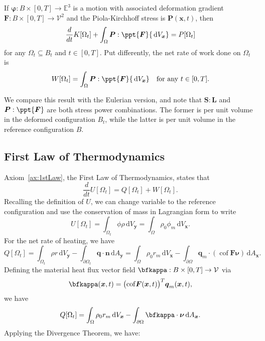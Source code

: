 \documentclass[
  letterpaper,
  DIV=11,
  numbers=noendperiod]{scrreprt}
\theoremstyle{plain}
\theoremstyle{remark}
\begin{document}
If \({\boldsymbol{\varphi}}:B\times[0,T]\to{\mathbb{E}}^3\) is a motion
with associated deformation gradient
\({\boldsymbol{F}}:B\times[0,T]\to{\mathcal{V}}^2\) and the
Piola-Kirchhoff stress is \({\boldsymbol{P}}({\boldsymbol{x}},t)\), then
\[\frac{d}{dt}K[\Omega_t] +\int_\Omega {\boldsymbol{P}}:\ppt{\boldsymbol{F}}{\,{\mathrm{d}}V_{{\boldsymbol{x}}}}= P[\Omega_t]\]
for any \(\Omega_t\subseteq B_t\) and \(t\in[0,T]\). Put differently,
the net rate of work done on \(\Omega_t\) is
\[W[\Omega_t] = \int_\Omega {\boldsymbol{P}}:\ppt{\boldsymbol{F}}{\,{\mathrm{d}}V_{{\boldsymbol{x}}}}\quad\text{for any }t\in[0,T].\]

We compare this result with the Eulerian version, and note that
\({\boldsymbol{S}}:{\boldsymbol{L}}\) and
\({\boldsymbol{P}}:\ppt{\boldsymbol{F}}\) are both stress power
combinations. The former is per unit volume in the deformed
configuration \(B_t\), while the latter is per unit volume in the
reference configuration \(B\).

\subsection{First Law of
Thermodynamics}\label{first-law-of-thermodynamics-1}

Axiom~\hyperref[ax:1stLaw]{{[}ax:1stLaw{]}}, the First Law of
Thermodynamics, states that
\[\frac{d}{dt}U[\Omega_t] = Q[\Omega_t]+W[\Omega_t].\] Recalling the
definition of \(U\), we can change variable to the reference
configuration and use the conservation of mass in Lagrangian form to
write
\[U[\Omega_t] = \int_{\Omega_t}\phi\rho {\,{\mathrm{d}}V_{{\boldsymbol{y}}}}= \int_{\Omega} \rho_0\phi_m{\,{\mathrm{d}}V_{{\boldsymbol{x}}}}.\]
For the net rate of heating, we have
\[Q[\Omega_t] = \int_{\Omega_t}\rho r {\,{\mathrm{d}}V_{{\boldsymbol{y}}}}-\int_{\partial\Omega_t}{\boldsymbol{q}}\cdot{\boldsymbol{n}}{\,{\mathrm{d}}A_{{\boldsymbol{y}}}}= \int_\Omega\rho_0r_m{\,{\mathrm{d}}V_{{\boldsymbol{x}}}}-\int_{\partial \Omega}{\boldsymbol{q}}_m\cdot({\operatorname{cof}}{\boldsymbol{F}}{\boldsymbol{\nu}}){\,{\mathrm{d}}A_{{\boldsymbol{x}}}}.\]
Defining the material heat flux vector field
\(\bfkappa:B\times[0,T]\to{\mathcal{V}}\) via
\[\bfkappa({\boldsymbol{x}},t) = \big({\operatorname{cof}}{\boldsymbol{F}}({\boldsymbol{x}},t)\big)^T{\boldsymbol{q}}_m({\boldsymbol{x}},t),\]
we have
\[Q[\Omega_t] = \int_\Omega\rho_0r_m{\,{\mathrm{d}}V_{{\boldsymbol{x}}}}-\int_{\partial \Omega}\bfkappa\cdot{\boldsymbol{\nu}}{\,{\mathrm{d}}A_{{\boldsymbol{x}}}}.\]
Applying the Divergence Theorem, we have:
\end{document}
